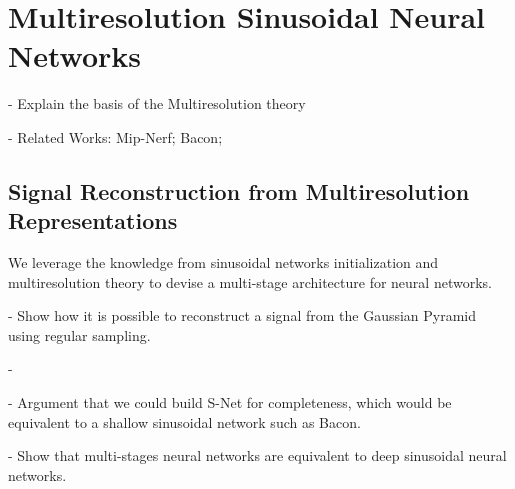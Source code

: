 \section{Multiresolution Sinusoidal Neural Networks}

- Explain the basis of the Multiresolution theory

- Related Works: Mip-Nerf; Bacon; 

\subsection{Signal Reconstruction from Multiresolution Representations }

We leverage the knowledge from sinusoidal networks initialization and multiresolution theory to devise a multi-stage architecture for neural networks. 

- Show how it is possible to reconstruct a signal from the Gaussian Pyramid using regular sampling.

- 

- Argument that we could build S-Net for completeness, which would be equivalent to a shallow sinusoidal network such as Bacon.

- Show that multi-stages neural networks are equivalent to deep sinusoidal neural networks.



